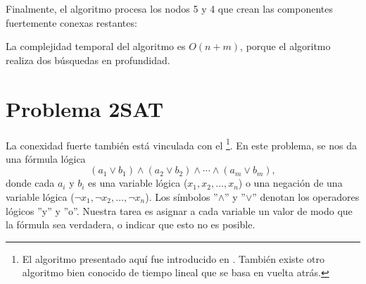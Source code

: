 \begin{samepage}
Finalmente, el algoritmo procesa los nodos 5 y 4
que crean las componentes fuertemente conexas restantes:

\begin{center}
\end{center}
\end{samepage}

La complejidad temporal del algoritmo es $O(n+m)$,
porque el algoritmo
realiza dos búsquedas en profundidad.

\section{Problema 2SAT}


La conexidad fuerte también está vinculada con el
\footnote{El algoritmo presentado aquí fue
introducido en \cite{asp79}.
También existe otro algoritmo bien conocido de tiempo lineal \cite{eve75}
que se basa en vuelta atrás.}.
En este problema, se nos da una fórmula lógica
\[
(a_1 \lor b_1) \land (a_2 \lor b_2) \land \cdots \land (a_m \lor b_m),
\]
donde cada $a_i$ y $b_i$ es una variable lógica
($x_1,x_2,\ldots,x_n$)
o una negación de una variable lógica
($\lnot x_1, \lnot x_2, \ldots, \lnot x_n$).
Los símbolos ''$\land$'' y ''$\lor$'' denotan
los operadores lógicos ''y'' y ''o''.
Nuestra tarea es asignar a cada variable un valor
de modo que la fórmula sea verdadera, o indicar
que esto no es posible.

